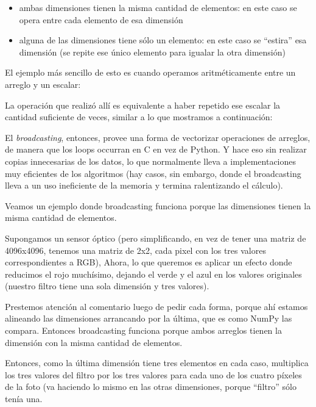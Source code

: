 \begin{itemize}
 \item ambas dimensiones tienen la misma cantidad de elementos: en este caso se opera entre cada elemento de esa dimensión
 \item alguna de las dimensiones tiene sólo un elemento: en este caso se ``estira'' esa dimensión (se repite ese único elemento para igualar la otra dimensión)
\end{itemize}

El ejemplo más sencillo de esto es cuando operamos aritméticamente entre un arreglo y un escalar:


La operación que realizó allí es equivalente a haber repetido ese escalar la cantidad suficiente de veces, similar a lo que mostramos a continuación:


El \textit{broadcasting}, entonces, provee una forma de vectorizar operaciones de arreglos, de manera que los loops occurran en C en vez de Python. Y hace eso sin realizar copias innecesarias de los datos, lo que normalmente lleva a implementaciones muy eficientes de los algoritmos (hay casos, sin embargo, donde el broadcasting lleva a un uso ineficiente de la memoria y termina ralentizando el cálculo).

Veamos un ejemplo donde broadcasting funciona porque las dimensiones tienen la misma cantidad de elementos.

Supongamos un sensor óptico (pero simplificando, en vez de tener una matriz de 4096x4096, tenemos una matriz de 2x2, cada pixel con los tres valores correspondientes a RGB), Ahora, lo que queremos es aplicar un efecto donde reducimos el rojo muchísimo, dejando el verde y el azul en los valores originales (nuestro filtro tiene una sola dimensión y tres valores).

Prestemos atención al comentario luego de pedir cada forma, porque ahí estamos alineando las dimensiones arrancando por la última, que es como NumPy las compara. Entonces broadcasting funciona porque ambos arreglos tienen la dimensión con la misma cantidad de elementos.


Entonces, como la última dimensión tiene tres elementos en cada caso, multiplica los tres valores del filtro por los tres valores para cada uno de los cuatro píxeles de la foto (va haciendo lo mismo en las otras dimensiones, porque ``filtro'' sólo tenía una.

